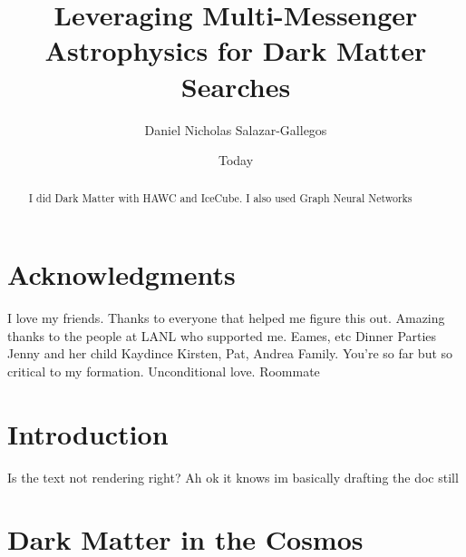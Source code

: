\documentclass[PhD]{msu-thesis}
\title{Leveraging Multi-Messenger Astrophysics for Dark Matter Searches}
\author{Daniel Nicholas Salazar-Gallegos}
\date{Today}
\begin{document}
\frontmatter
\maketitlepage

\begin{abstract}
    I did Dark Matter with HAWC and IceCube. I also used Graph Neural Networks
\end{abstract}

\clearpage

\makecopyrightpage

\clearpage

\chapter*{Acknowledgments}
\DoubleSpacing
I love my friends.
Thanks to everyone that helped me figure this out.
Amazing thanks to the people at LANL who supported me.
Eames, etc
Dinner Parties
Jenny and her child Kaydince
Kirsten, Pat, Andrea
Family. You're so far but so critical to my formation. Unconditional love.
Roommate

\clearpage

\SingleSpacing

\tableofcontents*
\clearpage

\listoftables

\clearpage

\listoffigures


\mainmatter

\chapter{Introduction\label{sec:intro}}
Is the text not rendering right? Ah ok it knows im basically drafting the doc still

\chapter{Dark Matter in the Cosmos\label{sec:dm_cosmos}}

\end{document}
